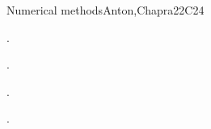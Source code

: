 \begin{syllabus}
\begin{unit}{Numerical methods}{}{Anton,Chapra}{22}{C24}
   \begin{learningoutcomes}
      \item . %
      \item . %
      \item . %
      \item . %
      \end{learningoutcomes}
\end{unit}

\begin{coursebibliography}
\end{coursebibliography}

\end{syllabus}

%
